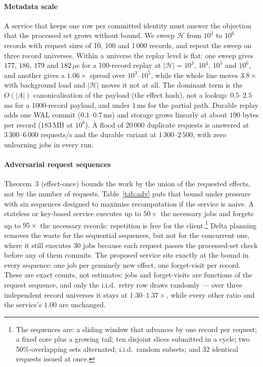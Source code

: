 \documentclass[conference]{IEEEtran}
\newcommand{\Hset}{\mathcal{H}}
\begin{document}
\paragraph{Metadata scale}
A service that keeps one row per committed identity must answer the objection that the
processed set grows without bound.  We sweep $\Hset$ from $10^3$ to $10^6$ records with
request sizes of 10, 100 and 1\,000 records, and repeat the sweep on three record
universes.  Within a universe the replay level is flat: one sweep gives $177$, $186$,
$179$ and $182\,\mu$s for a 100-record replay at $|\Hset|=10^3$, $10^4$, $10^5$ and
$10^6$, and another gives a $1.06\times$ spread over $10^3$--$10^5$, while the whole
line moves $3.8\times$ with background load and $|\Hset|$ moves it not at all.  The dominant term is the $O(|A|)$
canonicalisation of the payload (the effect hash), not a lookup: $0.5$--$2.5$\,ms for a
1000-record payload, and under $1$\,ms for the partial path.  Durable replay adds one
WAL commit ($0.1$--$0.7$\,ms) and storage grows linearly at about $190$ bytes per record
($183$\,MB at $10^6$).  A flood of 20\,000 duplicate requests is answered at
$3\,300$--$6\,000$ requests/s and the durable variant at $1\,300$--$2\,500$, with zero
unlearning jobs in every run.

\paragraph{Adversarial request sequences}
Theorem~3 (effect-once) bounds the work by the union of the requested effects, not by
the number of requests.  Table~\ref{tab:adv} puts that bound under pressure with six
sequences designed to maximise recomputation if the service is naive.  A stateless or
key-based service executes up to $50\times$ the necessary jobs and forgets up to
$95\times$ the necessary records: repetition is free for the client.\footnote{The
sequences are: a sliding window that advances by one record per request; a fixed core
plus a growing tail; ten disjoint slices submitted in a cycle; two 50\%-overlapping
sets alternated; i.i.d.\ random subsets; and 32 identical requests issued at once.}
Delta planning removes the waste for the sequential sequences, but not for the
concurrent one, where it still executes 30 jobs because each request passes the
processed-set check before any of them commits.  The proposed service sits exactly at
the bound in every sequence: one job per genuinely new effect, one forget-visit per
record.  These are exact counts, not estimates: jobs and forget-visits are functions of
the request sequence, and only the i.i.d.\ retry row draws randomly --- over three
independent record universes it stays at $1.30$--$1.37\times$, while every other ratio
and the service's $1.00$ are unchanged.
\end{document}
